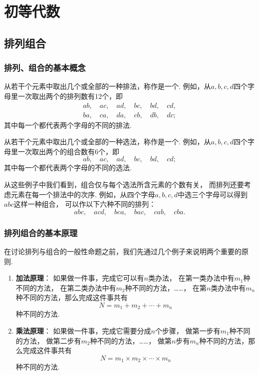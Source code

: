 \chapter{初等代数}
\section{排列组合}
\subsection{排列、组合的基本概念}
从若干个元素中取出几个或全部的一种排法，称作是一个.
例如，从\(a,b,c,d\)四个字母里一次取出两个的排列数有12个，即\[
	\begin{gathered}
	ab, \quad
	ac, \quad
	ad, \quad
	bc, \quad
	bd, \quad
	cd, \\
	ba, \quad
	ca, \quad
	da, \quad
	cb, \quad
	db, \quad
	dc;
	\end{gathered}
\]
其中每一个都代表两个字母的不同的排法.

从若干个元素中取出几个或全部的一种选法，称作是一个.
例如，从\(a,b,c,d\)四个字母里一次取出两个的组合数有6个，即\[
	ab, \quad
	ac, \quad
	ad, \quad
	bc, \quad
	bd, \quad
	cd;
\]
其中每一个都代表两个字母的不同的选法.

从这些例子中我们看到，组合仅与每个选法所含元素的个数有关，
而排列还要考虑元素在每一个排法中的次序.
例如，从四个字母\(a,b,c,d\)中选三个字母可以得到\(abc\)这样一种组合，
可以作以下六种不同的排列：\[
	abc, \quad
	acd, \quad
	bca, \quad
	bac, \quad
	cab, \quad
	cba.
\]

\subsection{排列组合的基本原理}
在讨论排列与组合的一般性命题之前，我们先通过几个例子来说明两个重要的原则.
\begin{enumerate}
	\item {\bf 加法原理}：
	如果做一件事，完成它可以有\(n\)类办法，
	在第一类办法中有\(m_1\)种不同的方法，
	在第二类办法中有\(m_2\)种不同的方法，……，
	在第\(n\)类办法中有\(m_n\)种不同的方法，那么完成这件事共有\[
	N = m_1 + m_2 + \dotsb + m_n
	\]种不同的方法.

	\item {\bf 乘法原理}：
	如果做一件事，完成它需要分成\(n\)个步骤，
	做第一步有\(m_1\)种不同的方法，
	做第二步有\(m_2\)种不同的方法，……，
	做第\(n\)步有\(m_n\)种不同的方法，那么完成这件事共有\[
	N = m_1 \times m_2 \times \dotsm \times m_n
	\]种不同的方法.
\end{enumerate}

